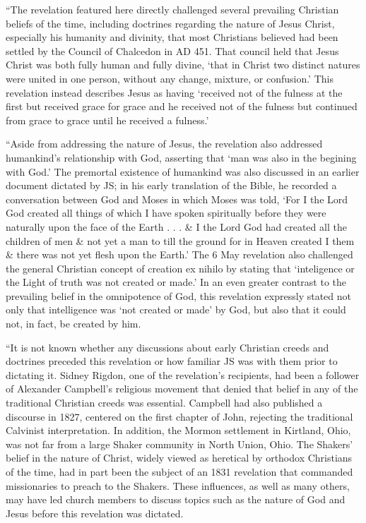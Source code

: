 			``The revelation featured here directly challenged several prevailing Christian beliefs of the time, including doctrines regarding the nature of Jesus Christ, especially his humanity and divinity, that most Christians believed had been settled by the Council of Chalcedon in AD 451. That council held that Jesus Christ was both fully human and fully divine, `that in Christ two distinct natures were united in one person, without any change, mixture, or confusion.' This revelation instead describes Jesus as having `received not of the fulness at the first but received grace for grace and he received not of the fulness but continued from grace to grace until he received a fulness.'

			``Aside from addressing the nature of Jesus, the revelation also addressed humankind's relationship with God, asserting that `man was also in the begining with God.' The premortal existence of humankind was also discussed in an earlier document dictated by JS; in his early translation of the Bible, he recorded a conversation between God and Moses in which Moses was told, `For I the Lord God created all things of which I have spoken spiritually before they were naturally upon the face of the Earth . . . \& I the Lord God had created all the children of men \& not yet a man to till the ground for in Heaven created I them \& there was not yet flesh upon the Earth.' The 6 May revelation also challenged the general Christian concept of creation ex nihilo by stating that `inteligence or the Light of truth was not created or made.' In an even greater contrast to the prevailing belief in the omnipotence of God, this revelation expressly stated not only that intelligence was `not created or made' by God, but also that it could not, in fact, be created by him.

			``It is not known whether any discussions about early Christian creeds and doctrines preceded this revelation or how familiar JS was with them prior to dictating it. Sidney Rigdon, one of the revelation's recipients, had been a follower of Alexander Campbell's religious movement that denied that belief in any of the traditional Christian creeds was essential. Campbell had also published a discourse in 1827, centered on the first chapter of John, rejecting the traditional Calvinist interpretation. In addition, the Mormon settlement in Kirtland, Ohio, was not far from a large Shaker community in North Union, Ohio. The Shakers' belief in the nature of Christ, widely viewed as heretical by orthodox Christians of the time, had in part been the subject of an 1831 revelation that commanded missionaries to preach to the Shakers. These influences, as well as many others, may have led church members to discuss topics such as the nature of God and Jesus before this revelation was dictated.

